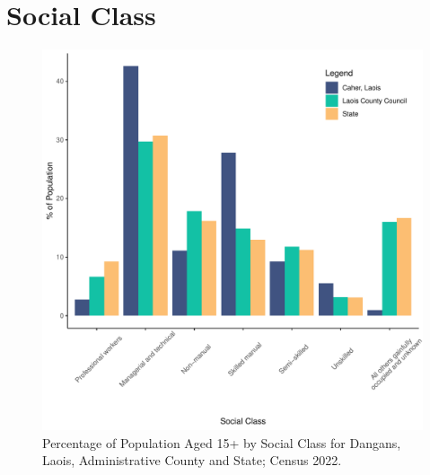 \documentclass{article}
\begin{document}
\section{Social Class}\label{sect:SC}
\begin{figure}[H]
	\centering
	\includegraphics[width = 140mm]{../figures/SocialClassED.pdf}
	\caption{Percentage of Population Aged 15+ by Social Class for Dangans, Laois, Administrative County and State; Census 2022.}
	\label{fig:vbnv}
	\end{figure}
\end{document}
